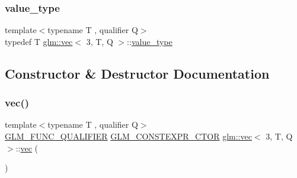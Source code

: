 \mbox{\label{structglm_1_1vec_3_013_00_01_t_00_01_q_01_4_ac9d049f83235863ada16f91e67d28e3f}} 
\subsubsection{\texorpdfstring{value\+\_\+type}{value\_type}}
{\footnotesize\ttfamily template$<$typename T , qualifier Q$>$ \\
typedef T \mbox{\hyperlink{structglm_1_1vec}{glm\+::vec}}$<$ 3, T, Q $>$\+::\mbox{\hyperlink{structglm_1_1vec_3_013_00_01_t_00_01_q_01_4_ac9d049f83235863ada16f91e67d28e3f}{value\+\_\+type}}}



\subsection{Constructor \& Destructor Documentation}
\mbox{\label{structglm_1_1vec_3_013_00_01_t_00_01_q_01_4_af6f5237c5ef6d93d6125989b4657b3cc}} 
\subsubsection{\texorpdfstring{vec()}{vec()}\hspace{0.1cm}{\footnotesize\ttfamily [1/23]}}
{\footnotesize\ttfamily template$<$typename T , qualifier Q$>$ \\
\mbox{\hyperlink{setup_8hpp_a33fdea6f91c5f834105f7415e2a64407}{G\+L\+M\+\_\+\+F\+U\+N\+C\+\_\+\+Q\+U\+A\+L\+I\+F\+I\+ER}} \mbox{\hyperlink{setup_8hpp_ad34178a09666081abdb573c14d1f4a5a}{G\+L\+M\+\_\+\+C\+O\+N\+S\+T\+E\+X\+P\+R\+\_\+\+C\+T\+OR}} \mbox{\hyperlink{structglm_1_1vec}{glm\+::vec}}$<$ 3, T, Q $>$\+::\mbox{\hyperlink{structglm_1_1vec}{vec}} (\begin{DoxyParamCaption}{ }\end{DoxyParamCaption})}

\mbox{\label{structglm_1_1vec_3_013_00_01_t_00_01_q_01_4_ae7088be55070909fe11da6bead3679f9}} 
